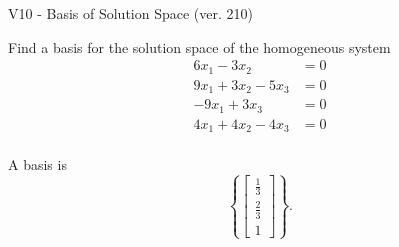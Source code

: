 \begin{exercise}
  \begin{exerciseTitle}V10 - Basis of Solution Space (ver. 210)\end{exerciseTitle}
  \begin{exerciseStatement}
    Find a basis for the solution space of the homogeneous system 
\begin{align*}
 6 x_ 1 -3 x_ 2 &= 0  \\ 
  9 x_ 1 + 3 x_ 2 -5 x_ 3 &= 0  \\ 
  -9 x_ 1 + 3 x_ 3 &= 0  \\ 
  4 x_ 1 + 4 x_ 2 -4 x_ 3 &= 0  \\ 
 \end{align*}


 
  \end{exerciseStatement}

  \begin{exerciseAnswer}
   A basis is   
\[\left\{\left[\begin{array}{c}
\frac{1}{3} \\
\frac{2}{3} \\
1
\end{array}\right]\right\}.\]

  


  \end{exerciseAnswer}
\end{exercise}